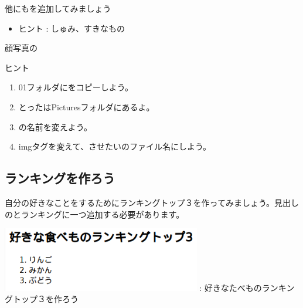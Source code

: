 \documentclass[a4paper,12pt]{jarticle}
\begin{document}
\clearpage
{}\theQuestion\label{Q:hasAnswer04-4}

他にもを追加してみましょう

\begin{itemize}
  \item ヒント : しゅみ、すきなもの
\end{itemize}
\theQuestion\label{Q:hasAnswer04-5}

顔写真の

ヒント

\begin{enumerate}
  \item
        01フォルダにをコピーしよう。
  \item とったはPicturesフォルダにあるよ。
  \item {}の名前を変えよう。
  \item
        imgタグを変えて、させたいのファイル名にしよう。
\end{enumerate}

\bigskip


\bigskip

\clearpage
{}
\subsection{\theExercise ランキングを作ろう}
自分の好きなことをするためにランキングトップ３を作ってみましょう。見出しのとランキングに一つ追加する必要があります。



\bigskip


\begin{minipage}{\textwidth}
  {\upshape
    \includegraphics[width=0.65\textwidth]{textbook-img178.png}
    \newline
    :
    好きなたべものランキングトップ３を作ろう}
\end{minipage}


\bigskip
\end{document}
